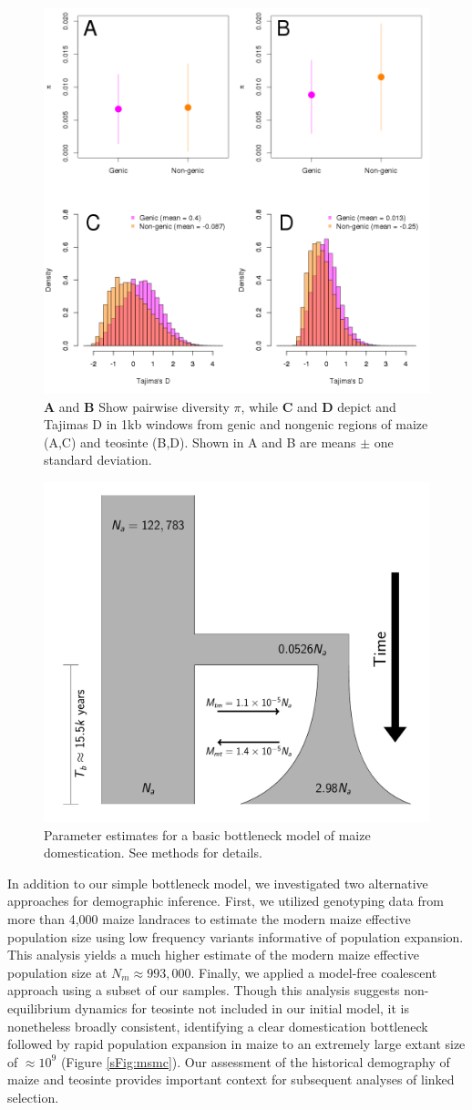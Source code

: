 \documentclass{pnastwo}
\begin{document}
\begin{article}
\begin{figure}[!tb]
\begin{center}
  \includegraphics[width=.45\textwidth] {FigsAndFiles/Pi_and_Tajima.png}
\end{center}
\caption{\textbf{A} and \textbf{B} Show pairwise diversity $\pi$, while \textbf{C} and \textbf{D} depict and Tajimas D in 1kb windows from genic and nongenic regions of maize (A,C) and teosinte (B,D). Shown in A and B are means $\pm$ one standard deviation.   \label{fig:diversity} }
\end{figure}


\begin{figure}[!tb]
\centering
\includegraphics[width=.5\textwidth]{FigsAndFiles/DomesticationModel/domesticationModel.pdf}
\caption{Parameter estimates for a basic bottleneck model of maize domestication. See methods for details. \label{fig:bottleneck} }
\end{figure}

In addition to our simple bottleneck model, we investigated two alternative approaches for demographic inference.  First, we utilized genotyping data from more than 4,000 maize landraces \cite{Hearne2015} to estimate the modern maize effective population size using low frequency variants  informative of population expansion. 
This analysis yields a much higher estimate of the modern maize effective population size at  $N_m \approx 993,000$.
Finally, we applied a model-free coalescent approach \cite{schiffels2014} using a subset of our samples. 
Though this analysis suggests non-equilibrium dynamics for teosinte not included in our initial model, it is nonetheless broadly consistent, identifying a clear domestication bottleneck followed by rapid population expansion in maize to an extremely large extant size of $\approx 10^9$ (Figure \ref{sFig:msmc}).
Our assessment of the historical demography of maize and teosinte provides important context for subsequent analyses of linked selection.



\end{article}
\end{document}
